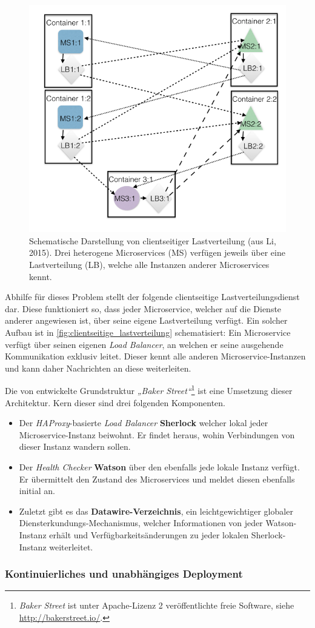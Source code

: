 \begin{figure}
	\centering
	\includegraphics[width=.55\linewidth]{img/clientloadbal}
	\caption{Schematische Darstellung von clientseitiger Lastverteilung (aus Li, 2015). Drei heterogene Microservices (MS) verfügen jeweils über eine Lastverteilung (LB), welche alle Instanzen anderer Microservices kennt.}
	\label{fig:clientseitige_lastverteilung}
\end{figure}

Abhilfe für dieses Problem stellt der folgende clientseitige Lastverteilungsdienst dar. Diese funktioniert so, dass jeder Microservice, welcher auf die Dienste anderer angewiesen ist, über seine eigene Lastverteilung verfügt. Ein solcher Aufbau ist in \autoref{fig:clientseitige_lastverteilung} schematisiert: Ein Microservice verfügt über seinen eigenen \textit{Load Balancer}, an welchen er seine ausgehende Kommunikation exklusiv leitet. Dieser kennt alle anderen Microservice-Instanzen und kann daher Nachrichten an diese weiterleiten.

Die von \citeauthor{Li15} entwickelte Grundstruktur \textit{„Baker Street“}\footnote{\textit{Baker Street} ist unter Apache-Lizenz 2 veröffentlichte freie Software, siehe \url{http://bakerstreet.io/}.} ist eine Umsetzung dieser Architektur. Kern dieser sind drei folgenden Komponenten.

\begin{itemize}
	\item Der \textit{HAProxy}-basierte \textit{Load Balancer} \textbf{Sherlock} welcher lokal jeder Microservice-Instanz beiwohnt. Er findet heraus, wohin Verbindungen von dieser Instanz wandern sollen.
	
	\item Der \textit{Health Checker} \textbf{Watson} über den ebenfalls jede lokale Instanz verfügt. Er übermittelt den Zustand des Microservices und meldet diesen ebenfalls initial an.
	
	\item Zuletzt gibt es das \textbf{Datawire-Verzeichnis}, ein leichtgewichtiger globaler Diensterkundungs-Mechanismus, welcher Informationen von jeder Watson-Instanz erhält und Verfügbarkeitsänderungen zu jeder lokalen Sherlock-Instanz weiterleitet.
\end{itemize}

\subsubsection{Kontinuierliches und unabhängiges Deployment}